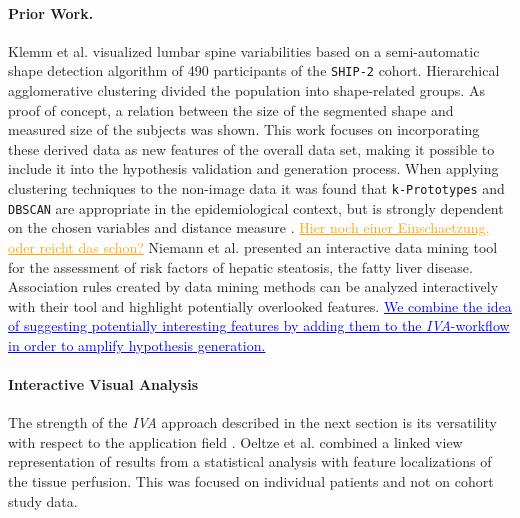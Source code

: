 \documentclass[journal]{style/vgtc} 			          %
\newcommand{\add}[1]{\textcolor{blue}{\uline{#1}}}
\newcommand{\com}[1]{\textcolor{orange}{\uline{#1}}}
\begin{document}
\paragraph{Prior Work.}
Klemm et al. \cite{Klemm2013VMV} visualized lumbar spine variabilities based on a semi-automatic shape detection algorithm of 490 participants of the \texttt{SHIP-2} cohort.
%
Hierarchical agglomerative clustering divided the population into shape-related groups.
%
As proof of concept, a relation between the size of the segmented shape and measured size of the subjects was shown.
%
This work focuses on incorporating these derived data as new features of the overall data set, making it possible to include it into the hypothesis validation and generation process.
%
When applying clustering techniques to the non-image data it was found that \texttt{k-Prototypes} and \texttt{DBSCAN} are appropriate in the epidemiological context, but is strongly dependent on the chosen variables and distance measure \cite{Klemm2014BVM}.
%
\com{Hier noch einer Einschaetzung, oder reicht das schon?}
%
Niemann et al. \cite{Niemann2014} presented an interactive data mining tool for the assessment of risk factors of hepatic steatosis, the fatty liver disease.
%
Association rules created by data mining methods can be analyzed interactively with their tool and highlight potentially overlooked features.
%
\add{We combine the idea of suggesting potentially interesting features by adding them to the \emph{IVA}-workflow in order to amplify hypothesis generation.}

\paragraph{Interactive Visual Analysis}
The strength of the \emph{IVA} approach described in the next section is its versatility with respect to the application field \cite{Konyha2009}.
%
Oeltze et al. \cite{Oeltze2007} combined a linked view representation of results from a statistical analysis with feature localizations of the tissue perfusion. %
%
This was focused on individual patients and not on cohort study data. 
%
\end{document}
